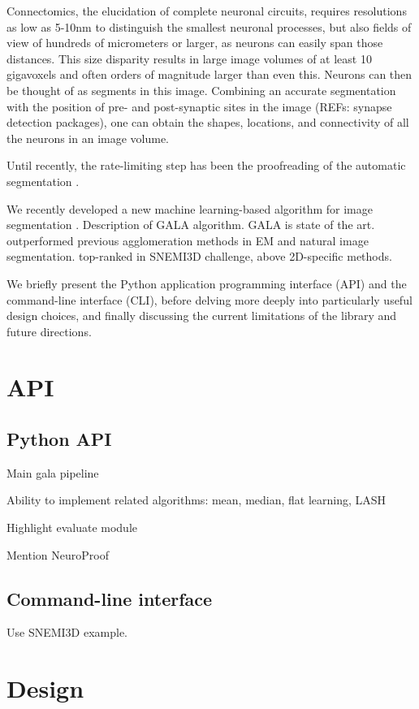 \documentclass{frontiersSCNS} %
\begin{document}
Connectomics, the elucidation of complete neuronal circuits, requires resolutions as low as 5-10nm to distinguish the smallest neuronal processes, but also fields of view of hundreds of micrometers or larger, as neurons can easily span those distances.
This size disparity results in large image volumes of at least 10 gigavoxels and often orders of magnitude larger than even this.
Neurons can then be thought of as segments in this image.
Combining an accurate segmentation with the position of pre- and post-synaptic sites in the image (REFs: synapse detection packages), one can obtain the shapes, locations, and connectivity of all the neurons in an image volume.

Until recently, the rate-limiting step has been the proofreading of the automatic segmentation \citep{Chklovskii:2010df}.

We recently developed a new machine learning-based algorithm for image segmentation \citep{NunezIglesias:2013cd}.
Description of GALA algorithm.
GALA is state of the art. outperformed previous agglomeration methods in EM and natural image segmentation. top-ranked in SNEMI3D challenge, above 2D-specific methods.

We briefly present the Python application programming interface (API) and the command-line interface (CLI), before delving more deeply into particularly useful design choices, and finally discussing the current limitations of the library and future directions.


\section{API}


\subsection{Python API}

Main gala pipeline

Ability to implement related algorithms: mean, median, flat learning, LASH

Highlight evaluate module

Mention NeuroProof


\subsection{Command-line interface}

Use SNEMI3D example.


\section{Design}
\end{document}
